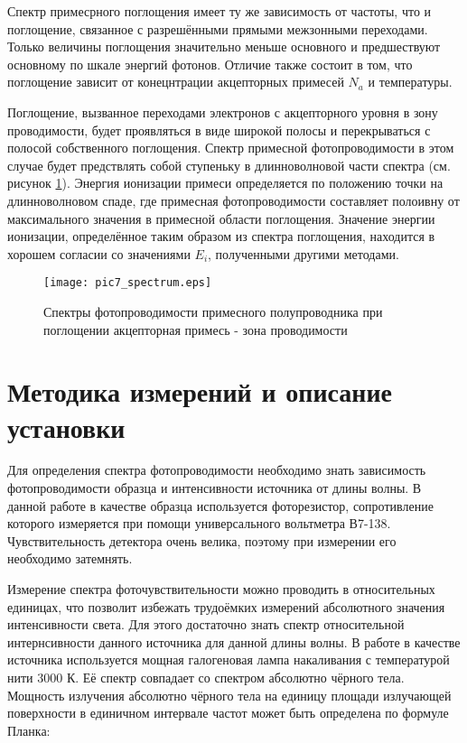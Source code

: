 Спектр примесрного поглощения имеет ту же зависимость от частоты, что и поглощение, связанное с разрешёнными прямыми межзонными переходами. Только величины поглощения значительно меньше основного и предшествуют основному по шкале энергий фотонов. Отличие также состоит в том, что поглощение зависит от конецнтрации акцепторных примесей $N_{a}$ и температуры.

Поглощение, вызванное переходами электронов с акцепторного уровня в зону проводимости, будет проявляться в виде широкой полосы и перекрываться с полосой собственного поглощения. Спектр примесной фотопроводимости в этом случае будет предствлять собой ступеньку в длинноволновой части спектра (см. рисунок \ref{pic7_spectrum}). Энергия ионизации примеси определяется по положению точки на длинноволновом спаде, где примесная фотопроводимости составляет полоивну от максимального значения в примесной области поглощения. Значение энергии ионизации, определённое таким образом из спектра поглощения, находится в хорошем согласии со значениями $E_{i}$, полученными другими методами.

\begin{figure}[h!]\centering
\texttt{[image: pic7\_spectrum.eps]}
\caption{Спектры фотопроводимости примесного полупроводника при поглощении акцепторная примесь - зона проводимости}
\label{pic7_spectrum}
\end{figure}

\section{Методика измерений и описание установки}
Для определения спектра фотопроводимости необходимо знать зависимость фотопроводимости образца и интенсивности источника от длины волны. В данной работе в качестве образца используется фоторезистор, сопротивление которого измеряется при помощи универсального вольтметра В7-138. Чувствительность детектора очень велика, поэтому при измерении его необходимо затемнять.

Измерение спектра фоточувствительности можно проводить в относительных единицах, что позволит избежать трудоёмких измерений абсолютного значения интенсивности света. Для этого достаточно знать спектр относительной интернсивности данного источника для данной длины волны. В работе в качестве источника используется мощная галогеновая лампа накаливания с температурой нити 3000 К. Её спектр совпадает со спектром абсолютно чёрного тела. Мощность излучения абсолютно чёрного тела на единицу площади излучающей поверхности в единичном интервале частот может быть определена по формуле Планка:

